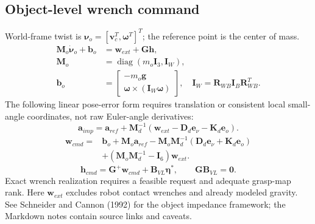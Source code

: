 \documentclass[11pt]{article}
\newcommand{\vect}[1]{\bm{#1}}
\newcommand{\pinv}{^{+}}
\begin{document}
\subsection*{Object-level wrench command}
World-frame twist is $\vect\nu_o=[\vect v_c^T,\vect\omega^T]^T$;
the reference point is the center of mass.
\begin{equation}
\begin{split}
\vect M_o\dot{\vect\nu}_o+\vect b_o&=\vect w_{ext}+\vect G\vect h,\\
\vect M_o&=\operatorname{diag}(m_o\vect I_3,\vect I_W),\\
\vect b_o&=\begin{bmatrix}-m_o\vect g\\
\vect\omega\times(\vect I_W\vect\omega)\end{bmatrix},\quad
\vect I_W=\vect R_{WB}\vect I_B\vect R_{WB}^T.
\end{split}\tag{IMP-05}
\end{equation}
The following linear pose-error form requires translation or consistent local
small-angle coordinates, not raw Euler-angle derivatives:
\begin{equation}
\vect a_{imp}=\vect a_{ref}+\vect M_d^{-1}
(\vect w_{ext}-\vect D_d\vect e_\nu-\vect K_d\vect e_o).
\tag{IMP-06}
\end{equation}
\begin{equation}
\begin{split}
\vect w_{cmd}={}&\vect b_o+\vect M_o\vect a_{ref}
-\vect M_o\vect M_d^{-1}(\vect D_d\vect e_\nu+\vect K_d\vect e_o)\\
&+(\vect M_o\vect M_d^{-1}-\vect I_6)\vect w_{ext}.
\end{split}\tag{IMP-07}
\end{equation}
\begin{equation}
\vect h_{cmd}=\vect G\pinv\vect w_{cmd}+\vect B_{VL}\vect\eta^*,
\qquad\vect G\vect B_{VL}=\vect0.\tag{IMP-08}
\end{equation}
\noindent Exact wrench realization requires a feasible request and adequate
grasp-map rank. Here $\vect w_{ext}$ excludes robot contact wrenches and
already modeled gravity. See Schneider and Cannon (1992) for the object
impedance framework; the Markdown notes contain source links and caveats.

\clearpage
\end{document}
